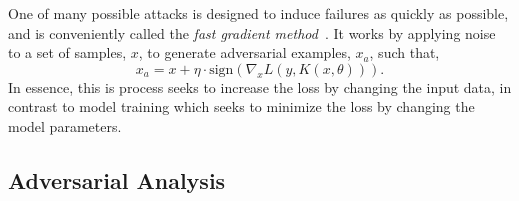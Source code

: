 \documentclass[conference]{IEEEtran}
\newcommand{\cm}[1]{\textit{{\color{blue}#1}}}
\begin{document}

One of many possible attacks is designed to induce failures as quickly as possible, and is  conveniently called the \textit{fast gradient method}~\cite{fgm}. It works by applying noise to a set of samples, $x$, to generate adversarial examples, $x_a$, such that,
\begin{equation}
x_a = x + \eta \cdot \mathrm{sign}(\nabla_x L(y, K(x, \theta))).
\label{eq:fgm}
\end{equation}
In essence, this is process seeks to increase the loss by changing the input data, in contrast to model training which seeks to minimize the loss by changing the model parameters.


\subsection{Adversarial Analysis}
\end{document}
